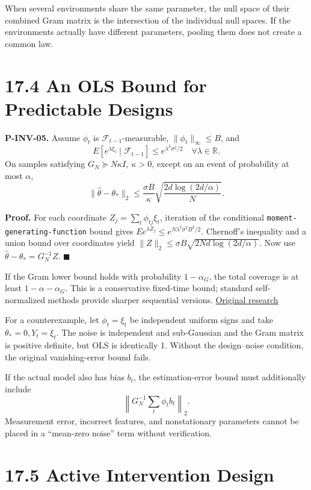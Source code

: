 \documentclass[
  english,
  11pt,
  oneside]{book}
\begin{document}
When several environments share the same parameter, the null space of their combined Gram matrix is the intersection of the individual null spaces. If the environments actually have different parameters, pooling them does not create a common law.

\section{17.4 An OLS Bound for Predictable Designs}\label{an-ols-bound-for-predictable-designs}

\hypertarget{p-inv-05}{}\label{p-inv-05}

\textbf{P-INV-05.} Assume \(\phi_t\) is \(\mathcal F_{t-1}\)-measurable, \(\|\phi_t\|_\infty\le B\), and \[E[e^{\lambda\xi_t}\mid\mathcal F_{t-1}]
\le e^{\lambda^2\sigma^2/2}
\quad\forall\lambda\in\mathbb R.\] On samples satisfying \(G_N\succeq N\kappa I,\ \kappa>0\), except on an event of probability at most \(\alpha\), \[\|\widehat\theta-\theta_*\|_2
\le\frac{\sigma B}{\kappa}
\sqrt{\frac{2d\log(2d/\alpha)}N}.\]

\textbf{Proof.} For each coordinate \(Z_j=\sum_t\phi_{tj}\xi_t\), iteration of the conditional \nolinkurl{moment-generating-function} bound gives \(E e^{\lambda Z_j}\le e^{N\lambda^2\sigma^2B^2/2}\). Chernoff's inequality and a union bound over coordinates yield \(\|Z\|_2\le\sigma B\sqrt{2Nd\log(2d/\alpha)}\). Now use \(\widehat\theta-\theta_*=G_N^{-1}Z\). \(\blacksquare\)

If the Gram lower bound holds with probability \(1-\alpha_G\), the total coverage is at least \(1-\alpha-\alpha_G\). This is a conservative fixed-time bound; standard self-normalized methods provide sharper sequential versions. \href{https://arxiv.org/abs/1102.2670}{Original research}

For a counterexample, let \(\phi_t=\xi_t\) be independent uniform signs and take \(\theta_*=0,Y_t=\xi_t\). The noise is independent and sub-Gaussian and the Gram matrix is positive definite, but OLS is identically 1. Without the design--noise condition, the original vanishing-error bound fails.

If the actual model also has bias \(b_t\), the estimation-error bound must additionally include \[\left\|G_N^{-1}\sum_t\phi_tb_t\right\|_2.\] Measurement error, incorrect features, and nonstationary parameters cannot be placed in a ``mean-zero noise'' term without verification.

\section{17.5 Active Intervention Design}\label{active-intervention-design}
\end{document}
